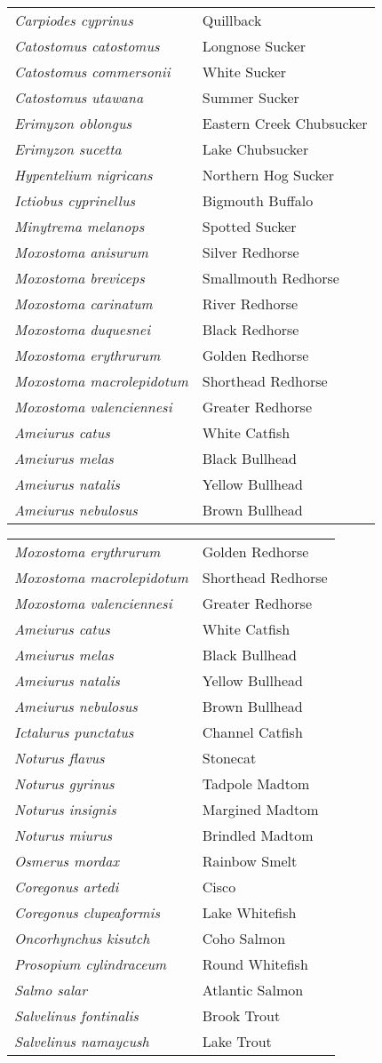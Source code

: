 \documentclass[11pt]{article}
\begin{document}
\vspace{\baselineskip}

%
\textbf{\Student}

\begin{tabular}{@{}L{3in}L{3in}@{}}
\textit{Carpiodes cyprinus} & Quillback\tabularnewline
\textit{Catostomus catostomus} & Longnose Sucker\tabularnewline
\textit{Catostomus commersonii} & White Sucker\tabularnewline
\textit{Catostomus utawana} & Summer Sucker\tabularnewline
\textit{Erimyzon oblongus} & Eastern Creek Chubsucker\tabularnewline
\textit{Erimyzon sucetta} & Lake Chubsucker\tabularnewline
\textit{Hypentelium nigricans} & Northern Hog Sucker\tabularnewline
\textit{Ictiobus cyprinellus} & Bigmouth Buffalo\tabularnewline
\textit{Minytrema melanops} & Spotted Sucker\tabularnewline
\textit{Moxostoma anisurum} & Silver Redhorse\tabularnewline
\textit{Moxostoma breviceps} & Smallmouth Redhorse\tabularnewline
\textit{Moxostoma carinatum} & River Redhorse\tabularnewline
\textit{Moxostoma duquesnei} & Black Redhorse\tabularnewline
\textit{Moxostoma erythrurum} & Golden Redhorse\tabularnewline
\textit{Moxostoma macrolepidotum} & Shorthead Redhorse\tabularnewline
\textit{Moxostoma valenciennesi} & Greater Redhorse\tabularnewline
\textit{Ameiurus catus} & White Catfish\tabularnewline
\textit{Ameiurus melas} & Black Bullhead\tabularnewline
\textit{Ameiurus natalis} & Yellow Bullhead\tabularnewline
\textit{Ameiurus nebulosus} & Brown Bullhead\tabularnewline
\end{tabular}

\newpage

\vspace{\baselineskip}

%
\textbf{\Student}

\begin{tabular}{@{}L{3in}L{3in}@{}}
\textit{Moxostoma erythrurum} & Golden Redhorse\tabularnewline
\textit{Moxostoma macrolepidotum} & Shorthead Redhorse\tabularnewline
\textit{Moxostoma valenciennesi} & Greater Redhorse\tabularnewline
\textit{Ameiurus catus} & White Catfish\tabularnewline
\textit{Ameiurus melas} & Black Bullhead\tabularnewline
\textit{Ameiurus natalis} & Yellow Bullhead\tabularnewline
\textit{Ameiurus nebulosus} & Brown Bullhead\tabularnewline
\textit{Ictalurus punctatus} & Channel Catfish\tabularnewline
\textit{Noturus flavus} & Stonecat\tabularnewline
\textit{Noturus gyrinus} & Tadpole Madtom\tabularnewline
\textit{Noturus insignis} & Margined Madtom\tabularnewline
\textit{Noturus miurus} & Brindled Madtom\tabularnewline
\textit{Osmerus mordax} & Rainbow Smelt\tabularnewline
\textit{Coregonus artedi} & Cisco\tabularnewline
\textit{Coregonus clupeaformis} & Lake Whitefish\tabularnewline
\textit{Oncorhynchus kisutch} & Coho Salmon\tabularnewline
\textit{Prosopium cylindraceum} & Round Whitefish\tabularnewline
\textit{Salmo salar} & Atlantic Salmon\tabularnewline
\textit{Salvelinus fontinalis} & Brook Trout\tabularnewline
\textit{Salvelinus namaycush} & Lake Trout\tabularnewline
\end{tabular}
\end{document}
